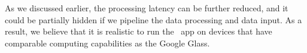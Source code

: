 As we discussed earlier, the processing latency can be further reduced, and it could be partially hidden if we pipeline the data processing and data input. As a result, we believe that it is realistic to run the \systemname~app on devices that have comparable computing capabilities as the Google Glass.

